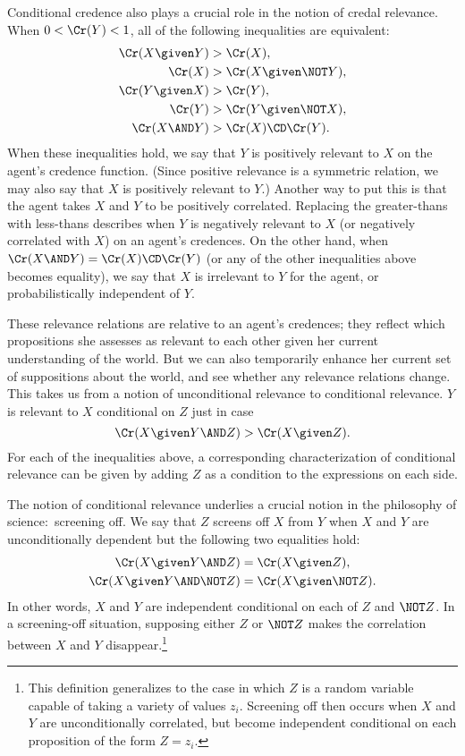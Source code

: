 Conditional credence also plays a crucial role in the notion of credal relevance. When $0<\Cr(Y)<1$, all of the following inequalities are equivalent:
\begin{align}
\Cr(X \given Y) &> \Cr(X),\\
\Cr(X) &> \Cr(X \given \NOT Y),\\
\Cr(Y \given X) &> \Cr(Y),\\
\Cr(Y) &> \Cr(Y \given \NOT X),\\
\Cr(X \AND Y) &> \Cr(X) \CD \Cr(Y).
\end{align} 
When these inequalities hold, we say that $Y$ is positively relevant to $X$ on the agent's credence function. (Since positive relevance is a symmetric relation, we may also say that $X$ is positively relevant to $Y$.) Another way to put this is that the agent takes $X$ and $Y$ to be positively correlated. Replacing the greater-thans with less-thans describes when $Y$ is negatively relevant to $X$ (or negatively correlated with $X$) on an agent's credences. On the other hand, when $\Cr(X \AND Y)=\Cr(X) \CD \Cr(Y)$ (or any of the other inequalities above becomes equality), we say that $X$ is irrelevant to $Y$ for the agent, or probabilistically independent of $Y$.

These relevance relations are relative to an agent's credences; they reflect which propositions she assesses as relevant to each other given her current understanding of the world. But we can also temporarily enhance her current set of suppositions about the world, and see whether any relevance relations change. This takes us from a notion of unconditional relevance to conditional relevance. $Y$ is relevant to $X$ conditional on $Z$ just in case
\begin{equation}
\Cr(X \given Y \AND Z)>\Cr(X \given Z).
\end{equation}
For each of the inequalities above, a corresponding characterization of conditional relevance can be given by adding $Z$ as a condition to the expressions on each side.

The notion of conditional relevance underlies a crucial notion in the philosophy of science:\ screening off. We say that $Z$ screens off $X$ from $Y$ when $X$ and $Y$ are unconditionally dependent but the following two equalities hold:
\begin{align}
\Cr(X \given Y \AND Z)&=\Cr(X \given Z),\\
\Cr(X \given Y \AND \NOT Z)&=\Cr(X \given \NOT Z).
\end{align}
In other words, $X$ and $Y$ are independent conditional on each of $Z$ and $\NOT Z$. In a screening-off situation, supposing either $Z$ or $\NOT Z$ makes the correlation between $X$ and $Y$ disappear.\footnote
{This definition generalizes to the case in which $Z$ is a random variable capable of taking a variety of values $z_i$. Screening off then occurs when $X$ and $Y$ are unconditionally correlated, but become independent conditional on each proposition of the form $Z=z_i$.}

